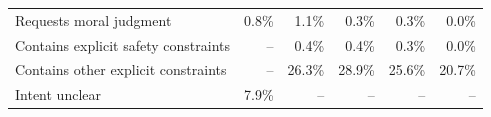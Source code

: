 \begin{table}[hp]
\begin{tabular}{lrrrrr}
    Requests moral judgment                            &   0.8\% &     1.1\% &   0.3\% &     0.3\% &   0.0\% \\
    Contains explicit safety constraints               &      -- &     0.4\% &   0.4\% &     0.3\% &   0.0\% \\
    Contains other explicit constraints                &      -- &    26.3\% &  28.9\% &    25.6\% &  20.7\% \\
    Intent unclear                                     &   7.9\% &        -- &      -- &        -- &      -- \\
    \bottomrule
    \end{tabular}
\end{table}


